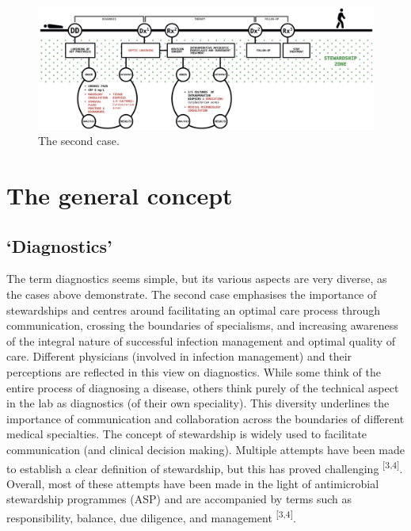 \documentclass[
]{book}
\begin{document}
\begin{figure}

{\centering \includegraphics[width=1\linewidth]{images/02-03} 

}

\caption{The second case.}\label{fig:fig2-3}
\end{figure}

\hypertarget{the-general-concept}{%
\section{The general concept}\label{the-general-concept}}

\hypertarget{diagnostics}{%
\subsection{`Diagnostics'}\label{diagnostics}}

The term diagnostics seems simple, but its various aspects are very diverse, as the cases above demonstrate. The second case emphasises the importance of stewardships and centres around facilitating an optimal care process through communication, crossing the boundaries of specialisms, and increasing awareness of the integral nature of successful infection management and optimal quality of care. Different physicians (involved in infection management) and their perceptions are reflected in this view on diagnostics. While some think of the entire process of diagnosing a disease, others think purely of the technical aspect in the lab as diagnostics (of their own speciality). This diversity underlines the importance of communication and collaboration across the boundaries of different medical specialties. The concept of stewardship is widely used to facilitate communication (and clinical decision making). Multiple attempts have been made to establish a clear definition of stewardship, but this has proved challenging \textsuperscript{{[}3,4{]}}. Overall, most of these attempts have been made in the light of antimicrobial stewardship programmes (ASP) and are accompanied by terms such as responsibility, balance, due diligence, and management \textsuperscript{{[}3,4{]}}.
\end{document}
